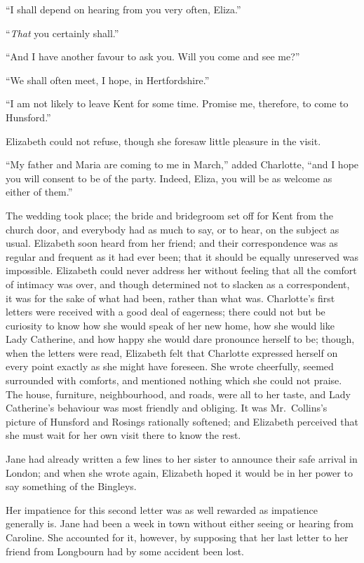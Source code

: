 ``I shall depend on hearing from you very often, Eliza.''

``\emph{That} you certainly shall.''

``And I have another favour to ask you.  Will you come and see
me?''

``We shall often meet, I hope, in Hertfordshire.''

``I am not likely to leave Kent for some time.  Promise me,
therefore, to come to Hunsford.''

Elizabeth could not refuse, though she foresaw little pleasure
in the visit.

``My father and Maria are coming to me in March,'' added
Charlotte, ``and I hope you will consent to be of the party.
Indeed, Eliza, you will be as welcome as either of them.''

The wedding took place; the bride and bridegroom set off for
Kent from the church door, and everybody had as much to say,
or to hear, on the subject as usual.  Elizabeth soon heard from
her friend; and their correspondence was as regular and frequent
as it had ever been; that it should be equally unreserved was
impossible.  Elizabeth could never address her without feeling
that all the comfort of intimacy was over, and though determined
not to slacken as a correspondent, it was for the sake of what
had been, rather than what was.  Charlotte's first letters were
received with a good deal of eagerness; there could not but be
curiosity to know how she would speak of her new home, how
she would like Lady Catherine, and how happy she would dare
pronounce herself to be; though, when the letters were read,
Elizabeth felt that Charlotte expressed herself on every point
exactly as she might have foreseen.  She wrote cheerfully,
seemed surrounded with comforts, and mentioned nothing which
she could not praise.  The house, furniture, neighbourhood, and
roads, were all to her taste, and Lady Catherine's behaviour
was most friendly and obliging.  It was Mr.\ Collins's picture
of Hunsford and Rosings rationally softened; and Elizabeth
perceived that she must wait for her own visit there to know the
rest.

Jane had already written a few lines to her sister to announce
their safe arrival in London; and when she wrote again, Elizabeth
hoped it would be in her power to say something of the
Bingleys.

Her impatience for this second letter was as well rewarded as
impatience generally is.  Jane had been a week in town without
either seeing or hearing from Caroline.  She accounted for it,
however, by supposing that her last letter to her friend from
Longbourn had by some accident been lost.

